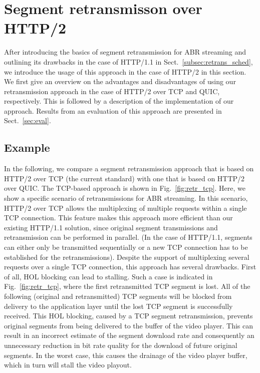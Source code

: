\section{Segment retransmisson over HTTP/2}
\label{sec:retrans}

After introducing the basics of segment retransmission for ABR streaming and outlining its drawbacks in the case of HTTP/1.1 in Sect.~\ref{subsec:retrans_sched}, we introduce the usage of this approach in the case of HTTP/2 in this section. We first give an overview on the advantages and disadvantages of using our retransmission approach in the case of HTTP/2 over TCP and QUIC, respectively. This is followed by a description of the implementation of our approach. Results from an evaluation of this approach are presented in Sect.~\ref{sec:eval}.

\subsection{Example}
\label{subsec:example}
In the following, we compare a segment retransmission approach that is based on HTTP/2 over TCP (the current standard) with one that is based on HTTP/2 over QUIC. The TCP-based approach is shown in Fig.~\ref{fig:retr_tcp}. Here, we show a specific scenario of retransmissions for ABR streaming. In this scenario, HTTP/2 over TCP allows the multiplexing of multiple requests within a single TCP connection. This feature makes this approach more efficient than our existing HTTP/1.1 solution, since original  segment transmissions and retransmission can be performed in parallel. (In the case of HTTP/1.1, segments can either only be transmitted sequentially or a new TCP connection has to be established for the retransmissions). Despite the support of multiplexing several requests over a single TCP connection, this approach has several drawbacks. First of all, HOL blocking can lead to stalling. Such a case is indicated in Fig.~\ref{fig:retr_tcp}, where the first retransmitted TCP segment is lost. All of the following (original and retransmitted) TCP segments will be blocked from delivery to the application layer until the lost TCP segment is successfully received. This HOL blocking, caused by a TCP segment retransmission, prevents original segments from being delivered to the buffer of the video player. 
This can result in an incorrect estimate of the segment download rate and consequently an unnecessary reduction in bit rate quality for the download of future original segments. In the worst case, this causes the drainage of the video player buffer, which in turn will stall the video playout.

